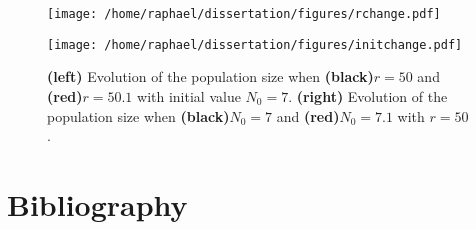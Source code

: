 \documentclass{article}
\begin{document}
	\begin{figure}[htb]
		\centering
		\begin{minipage}{0.4\textwidth}
			\centering
			\texttt{[image: /home/raphael/dissertation/figures/rchange.pdf]}
		\end{minipage}
		\begin{minipage}{0.4\textwidth}
			\centering
			\texttt{[image: /home/raphael/dissertation/figures/initchange.pdf]}
		\end{minipage}
		\caption{\textbf{(left)} Evolution of the population size when \textbf{(black)}$r=50$ and \textbf{(red)}$r=50.1$ with initial value $N_0=7$. \textbf{(right)} Evolution of the population size when \textbf{(black)}$N_0=7$ and \textbf{(red)}$N_0=7.1$ with $r=50$.}
		\label{fig:chaos}
	\end{figure}

\clearpage
	\section{Bibliography}
	
	{}
\end{document}
